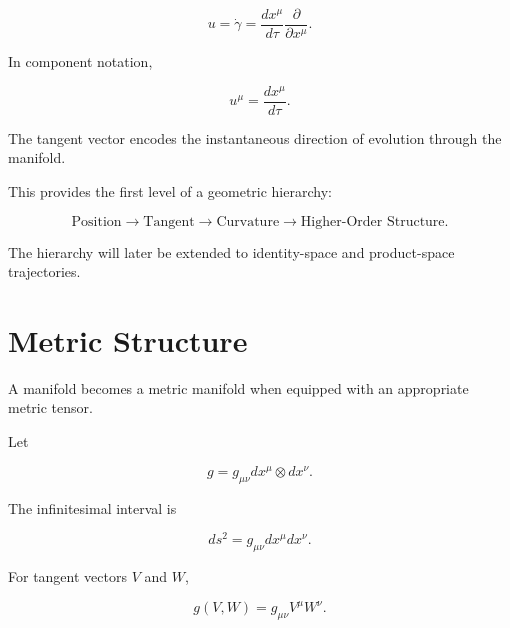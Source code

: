 \documentclass[12pt,oneside]{book}
\begin{document}
\begin{equation}
    u
    =
    \dot{\gamma}
    =
    \frac{dx^\mu}{d\tau}
    \frac{\partial}{\partial x^\mu}.
    \label{eq:trajectory-tangent}
\end{equation}

In component notation,

\begin{equation}
    u^\mu
    =
    \frac{dx^\mu}{d\tau}.
    \label{eq:tangent-components}
\end{equation}

The tangent vector encodes the instantaneous direction of
evolution through the manifold.

This provides the first level of a geometric hierarchy:

\begin{equation}
    \boxed{
    \text{Position}
    \rightarrow
    \text{Tangent}
    \rightarrow
    \text{Curvature}
    \rightarrow
    \text{Higher-Order Structure}
    }.
    \label{eq:geometric-hierarchy}
\end{equation}

The hierarchy will later be extended to identity-space and
product-space trajectories.


\section{Metric Structure}
\label{sec:metric-structure}

A manifold becomes a metric manifold when equipped with an
appropriate metric tensor.

Let

\begin{equation}
    g
    =
    g_{\mu\nu}
    dx^\mu
    \otimes
    dx^\nu.
    \label{eq:metric-tensor}
\end{equation}

The infinitesimal interval is

\begin{equation}
    ds^2
    =
    g_{\mu\nu}
    dx^\mu dx^\nu.
    \label{eq:general-line-element}
\end{equation}

For tangent vectors \(V\) and \(W\),

\begin{equation}
    g(V,W)
    =
    g_{\mu\nu}
    V^\mu W^\nu.
    \label{eq:metric-inner-product}
\end{equation}
\end{document}
